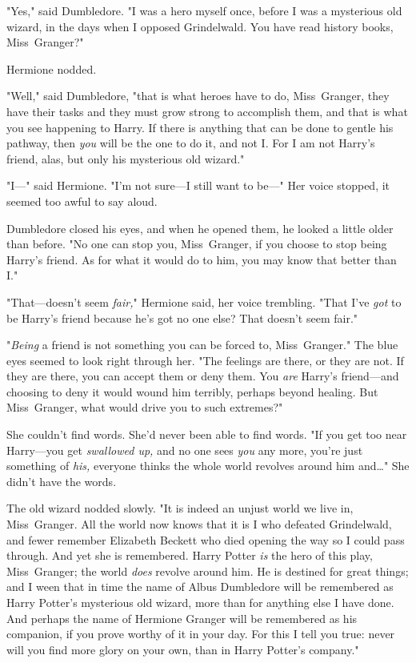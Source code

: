"Yes," said Dumbledore. "I was a hero myself once, before I was a mysterious
old wizard, in the days when I opposed Grindelwald. You have read history
books, Miss~Granger?"

Hermione nodded.

"Well," said Dumbledore, "that is what heroes have to do, Miss~Granger, they
have their tasks and they must grow strong to accomplish them, and that is what
you see happening to Harry. If there is anything that can be done to gentle his
pathway, then \emph{you} will be the one to do it, and not I\@. For I am not
Harry's friend, alas, but only his mysterious old wizard."

"I---" said Hermione. "I'm not sure---I still want to be---" Her voice stopped,
it seemed too awful to say aloud.

Dumbledore closed his eyes, and when he opened them, he looked a little older
than before. "No one can stop you, Miss~Granger, if you choose to stop being
Harry's friend. As for what it would do to him, you may know that better than
I."

"That---doesn't seem \emph{fair,}" Hermione said, her voice trembling. "That
I've \emph{got} to be Harry's friend because he's got no one else? That doesn't
seem fair."

"\emph{Being} a friend is not something you can be forced to, Miss~Granger."
The blue eyes seemed to look right through her. "The feelings are there, or
they are not. If they are there, you can accept them or deny them. You
\emph{are} Harry's friend---and choosing to deny it would wound him terribly,
perhaps beyond healing. But Miss~Granger, what would drive you to such
extremes?"

She couldn't find words. She'd never been able to find words. "If you get too
near Harry---you get \emph{swallowed up,} and no one sees \emph{you} any more,
you're just something of \emph{his,} everyone thinks the whole world revolves
around him and{\ldots}" She didn't have the words.

The old wizard nodded slowly. "It is indeed an unjust world we live in,
Miss~Granger. All the world now knows that it is I who defeated Grindelwald, and
fewer remember Elizabeth Beckett who died opening the way so I could pass
through. And yet she is remembered. Harry Potter \emph{is} the hero of this
play, Miss~Granger; the world \emph{does} revolve around him. He is destined
for great things; and I ween that in time the name of Albus Dumbledore will be
remembered as Harry Potter's mysterious old wizard, more than for anything else
I have done. And perhaps the name of Hermione Granger will be remembered as his
companion, if you prove worthy of it in your day. For this I tell you true:
never will you find more glory on your own, than in Harry Potter's company."

